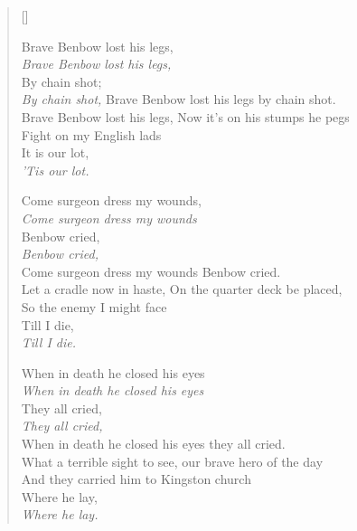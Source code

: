 \begin{verse}[\versewidth]
\begin{patverse}
Brave Benbow lost his legs,\\
\textit{Brave Benbow lost his legs,}\\
By chain shot;\\
\textit{By chain shot,}
Brave Benbow lost his legs by chain shot.\\
Brave Benbow lost his legs, Now it's on his stumps he pegs\\
Fight on my English lads\\
It is our lot,\\
\textit{'Tis our lot.}    
\end{patverse}

\begin{patverse}
Come surgeon dress my wounds,\\
\textit{Come surgeon dress my wounds}\\
Benbow cried,\\
\textit{Benbow cried,}\\
Come surgeon dress my wounds Benbow cried.\\
Let a cradle now in haste, On the quarter deck be placed,\\
So the enemy I might face\\
Till I die,\\
\textit{Till I die.}
\end{patverse}

\begin{patverse}
When in death he closed his eyes\\
\textit{When in death he closed his eyes}\\
They all cried,\\
\textit{They all cried,}\\
When in death he closed his eyes they all cried.\\
What a terrible sight to see, our brave hero of the day\\
And they carried him to Kingston church\\
Where he lay,\\
\textit{Where he lay.}
\end{patverse}
\end{verse}